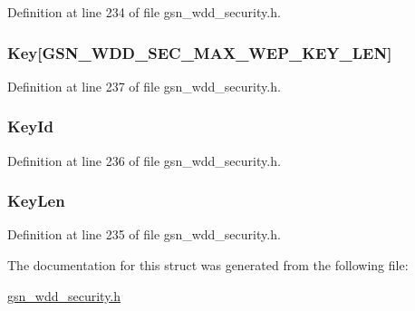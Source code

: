 Definition at line 234 of file gsn\_\-wdd\_\-security.h.

\hypertarget{a00295_a08f93955d4fbddbd79be87fb9c45f4dc}{
\subsubsection[{Key}]{ {\bf Key}\mbox{[}GSN\_\-WDD\_\-SEC\_\-MAX\_\-WEP\_\-KEY\_\-LEN\mbox{]}}}
\label{a00295_a08f93955d4fbddbd79be87fb9c45f4dc}


Definition at line 237 of file gsn\_\-wdd\_\-security.h.

\hypertarget{a00295_aea28dbc428bcea36020d3e61b5402138}{
\subsubsection[{KeyId}]{ {\bf KeyId}}}
\label{a00295_aea28dbc428bcea36020d3e61b5402138}


Definition at line 236 of file gsn\_\-wdd\_\-security.h.

\hypertarget{a00295_a4839acc8ac7df224398886c653505c1b}{
\subsubsection[{KeyLen}]{ {\bf KeyLen}}}
\label{a00295_a4839acc8ac7df224398886c653505c1b}


Definition at line 235 of file gsn\_\-wdd\_\-security.h.



The documentation for this struct was generated from the following file:\begin{DoxyCompactItemize}
\item 
\hyperlink{a00604}{gsn\_\-wdd\_\-security.h}\end{DoxyCompactItemize}
